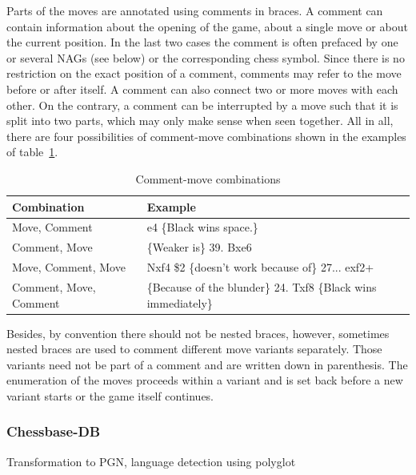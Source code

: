 \documentclass[article,type=msc,colorback,accentcolor=tud7b]{tudthesis}
\begin{document}
  	
	Parts of the moves are annotated using comments in braces. A comment can contain information about the opening of the game, about a single move or about the current position. In the last two cases the comment is often prefaced by one or several NAGs (see below) or the corresponding chess symbol. Since there is no restriction on the exact position of a comment, comments may refer to the move before or after itself. A comment can also connect two or more moves with each other. On the contrary, a comment can be interrupted by a move such that it is split into two parts, which may only make sense when seen together. All in all, there are four possibilities of comment-move combinations shown in the examples of table~\ref{tab:comment_move_combinations}.
	
	\begin{table}[H]
      \centering
      \begin{tabular}{| l | l |}
    	\hline
    	Combination & Example \\ \hline
    	Move, Comment & e4 \{Black wins space.\} \\ \hline
    	Comment, Move & \{Weaker is\} 39. Bxe6 \\ \hline
    	Move, Comment, Move & Nxf4 \$2 \{doesn't work because of\} 27... exf2+ \\ \hline
    	Comment, Move, Comment & \{Because of the blunder\} 24. Txf8 \{Black wins immediately\} \\ \hline
      \end{tabular}      
      \caption{Comment-move combinations}
      \label{tab:comment_move_combinations}
    \end{table}
    
    Besides, by convention there should not be nested braces, however, sometimes nested braces are used to comment different move variants separately.	Those variants need not be part of a comment and are written down in parenthesis. The enumeration of the moves proceeds within a variant and is set back before a new variant starts or the game itself continues. 
   
  \subsubsection{Chessbase-DB}
  	Transformation to PGN, language detection using polyglot
  
\end{document}
